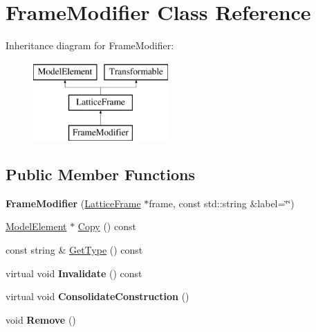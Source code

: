 \hypertarget{classFrameModifier}{}\section{Frame\+Modifier Class Reference}
\label{classFrameModifier}
Inheritance diagram for Frame\+Modifier\+:\begin{figure}[H]
\begin{center}
\leavevmode
\includegraphics[height=3.000000cm]{classFrameModifier}
\end{center}
\end{figure}
\subsection*{Public Member Functions}
\begin{DoxyCompactItemize}
\item 
\mbox{\label{classFrameModifier_ac2b2749ebbb3aece457efa89a5fdfe47}} 
{\bfseries Frame\+Modifier} (\hyperlink{classLatticeFrame}{Lattice\+Frame} $\ast$frame, const std\+::string \&label=\char`\"{}\char`\"{})
\item 
\hyperlink{classModelElement}{Model\+Element} $\ast$ \hyperlink{classFrameModifier_a26eef02b3d5e008da70d9cece9f018e4}{Copy} () const
\item 
const string \& \hyperlink{classFrameModifier_aeed9502abd0561668d9d654a08fef546}{Get\+Type} () const
\item 
\mbox{\label{classFrameModifier_af764b5f7b22ee16909d4d5b356a073a1}} 
virtual void {\bfseries Invalidate} () const
\item 
\mbox{\label{classFrameModifier_ad7c5b005b0d07cacdf2f3fb868d77fbb}} 
virtual void {\bfseries Consolidate\+Construction} ()
\item 
\mbox{\label{classFrameModifier_a9ed478874d82aad125893a9a30ee69d5}} 
void {\bfseries Remove} ()
\end{DoxyCompactItemize}
